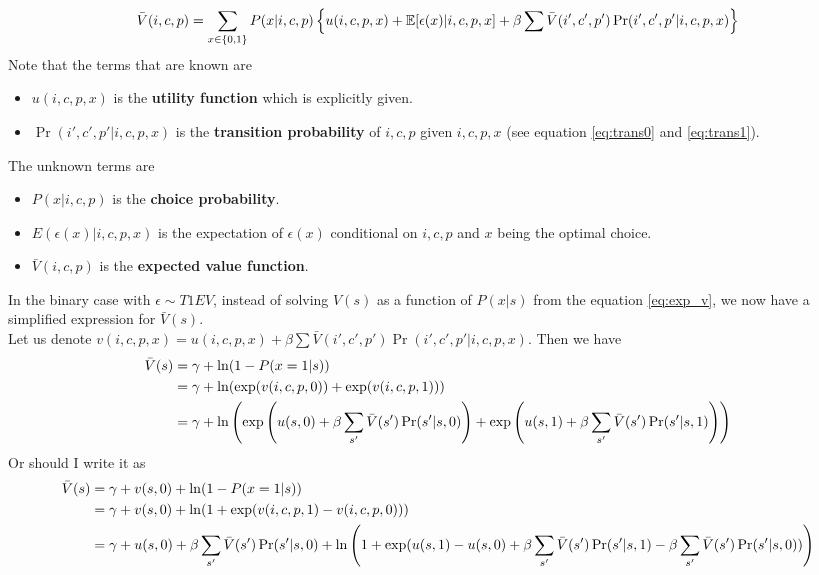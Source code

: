 \documentclass[12pt]{article}[margin=1in]
\begin{document}
\begin{equation}\label{eq:exp_v}
    \bar{V}(i,c,p) =\sum_{x \in \{0,1\}} P(x|i,c,p) \left\{ u(i,c,p,x) + \mathbb{E}[\epsilon(x)|i,c,p,x] + \beta \sum \bar{V}(i',c',p') \Pr(i',c',p'|i,c,p,x) \right\}
\end{equation}
Note that the terms that are known are
\begin{itemize}
    \item $u(i,c,p,x)$ is the \textbf{utility function} which is explicitly given.
    \item $\Pr(i',c',p'|i,c,p,x)$ is the \textbf{transition probability} of $i,c,p$ given $i,c,p,x$ (see equation \ref{eq:trans0} and \ref{eq:trans1}).
\end{itemize}
The unknown terms are
\begin{itemize}
    \item $P(x|i,c,p)$ is the \textbf{choice probability}.
    \item $E(\epsilon(x)|i,c,p,x)$ is the expectation of $\epsilon(x)$ conditional on $i,c,p$ and $x$ being the optimal choice.
    \item $\bar{V}(i,c,p)$ is the \textbf{expected value function}.

\end{itemize}
In the binary case with $\epsilon \sim T1EV$, instead of solving $V(s)$ as a function of $P(x|s)$ from the equation \ref{eq:exp_v}, we now have a simplified expression for $\bar{V}(s)$. \\
Let us denote ${v}(i,c,p,x) = u(i,c,p,x) +  \beta \sum \bar{V}(i',c',p') \Pr(i',c',p'|i,c,p,x)$. Then we have
\begin{equation}\label{eq:exp_v_binary}
    \begin{split}
        \bar{V}(s) & =  \gamma + \ln (1-P(x=1|s))                                                                                                        \\
                   & =  \gamma + \ln (\exp({v}(i,c,p,0)) + \exp({v}(i,c,p,1)))                                                                           \\
                   & =  \gamma + \ln\left(\exp\left(u(s,0) +  \beta \sum_{s'} \bar{V}(s') \Pr(s'|s,0)\right) + \exp\left(u(s,1) +  \beta \sum_{s'} \bar{V}(s') \Pr(s
                '|s,1)\right)\right)
    \end{split}
\end{equation}
Or should I write it as
\begin{equation}
    \begin{split}
        \bar{V}(s) & =  \gamma + v(s,0)+\ln (1-P(x=1|s))                                                                                                                                              \\
                   & =  \gamma + v(s,0)+\ln (1+\exp({v}(i,c,p,1)-{v}(i,c,p,0)))                                                                                                                       \\
                   & =  \gamma + u(s,0)+\beta \sum_{s'} \bar{V}(s') \Pr(s'|s,0)+\ln\left(1+ \exp(u(s,1) - u(s,0) +  \beta \sum_{s'} \bar{V}(s') \Pr(s'|s,1) - \beta \sum_{s'} \bar{V}(s') \Pr(s'|s,0))\right)
    \end{split}
\end{equation}
\end{document}
